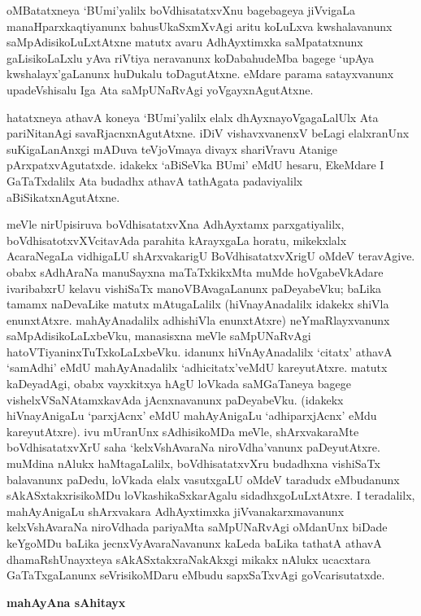 oMBatatxneya `BUmi'yalilx boVdhisatatxvXnu bagebageya jiVvigaLa manaHparxkaqti\-yanunx bahusUkaSxmXvAgi aritu koLuLxva kwshalavanunx saMpAdisikoLuLxtAtxne matutx avaru AdhAyxtimxka saMpatatxnunx gaLisikoLaLxlu yAva riVtiya neravanunx koDabahudeMba bagege `upAya kwshalayx'gaLanunx huDukalu toDagutAtxne. eMdare parama satayxvanunx upadeVshisalu Iga Ata saMpUNaRvAgi yoVgayxnAgutAtxne.

hatatxneya athavA koneya `BUmi'yalilx elalx dhAyxnayoVgagaLalUlx Ata pariNitanAgi savaRjacnxnAgutAtxne. iDiV vishavxvanenxV beLagi elalxranUnx suKigaLanAnxgi mADuva teVjoVmaya divayx shariVravu Atanige pArxpatxvAgutatxde. idakekx `aBiSeVka BUmi' eMdU hesaru, EkeMdare I GaTaTxdalilx Ata budadhx athavA tathAgata padaviyalilx aBiSikatxnAgutAtxne.

meVle nirUpisiruva boVdhisatatxvXna AdhAyxtamx parxgatiyalilx, boVdhisatotxvXVcitavAda parahita kArayxgaLa horatu, mikekxlalx AcaraNegaLa vidhigaLU shArxvakarigU BoVdhisatatxvXrigU oMdeV teravAgive. obabx sAdhAraNa manuSayxna maTaTxkikxMta muMde hoVgabeVkAdare ivaribabxrU kelavu vishiSaTx manoVBAvagaLanunx paDeyabeVku; baLika tamamx naDevaLike matutx mAtugaLalilx (hiVnayAnadalilx idakekx shiVla enunxtAtxre. mahAyAnadalilx adhi\-shiVla enunxtAtxre) neYmaRlayxvanunx saMpAdisikoLaLxbeVku, manasisxna meVle saMpUNaR\-vAgi hatoVTiyaninxTuTxkoLaLxbeVku. idanunx hiVnAyAnadalilx `citatx' athavA `samAdhi' eMdU mahAyAnadalilx `adhicitatx'veMdU kareyutAtxre. matutx kaDeyadAgi, obabx vayxkitxya hAgU loVkada saMGaTaneya bagege vishelxVSaNAtamxkavAda jAcnxnavanunx paDeya\-beVku. (idakekx hiVnayAni\-gaLu `parxjAcnx' eMdU mahAyAnigaLu `adhiparxjAcnx' eMdu kareyutAtxre). ivu mUranUnx sAdhisikoMDa meVle, shArxvakaraMte boVdhisatatxvXrU saha `kelxVshAvaraNa niroVdha'vanunx paDeyutAtxre. muMdina nAlukx haMtagaLalilx, boVdhi\-satatxvXru \hbox{budadhxna} vishiSaTx balavanunx paDedu, loVkada elalx vasutxgaLU oMdeV taradudx eMbudanunx sAkASx\-takxrisikoMDu loVkashikaSxkarAgalu sidadhxgoLuLxtAtxre. I teradalilx, mahA\-yAnigaLu shArxvakara AdhAyxtimxka jiVvanakarxmavanunx kelxVshAvaraNa niroVdhada pariyaMta saMpUNaR\-vAgi oMdanUnx biDade keYgoMDu baLika jecnxVyAvaraNavanunx kaLeda baLika tathatA athavA dhamaRshUnayxteya sAkASxtakxraNakAkxgi mikakx nAlukx ucacxtara GaTaTxgaLanunx seVrisikoMDaru eMbudu sapxSaTxvAgi goVcarisutatxde.

\begin{center}
{\textbf{\Large mahAyAna sAhitayx}}
\end{center}


